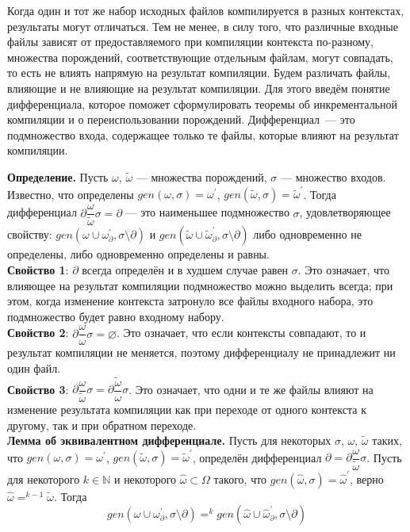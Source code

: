 
Когда один и тот же набор исходных файлов компилируется в разных контекстах, результаты могут отличаться. Тем не менее, в силу того, что различные входные файлы зависят от предоставляемого при компиляции контекста по-разному, множества порождений, соответствующие отдельным файлам, могут совпадать, то есть не влиять напрямую на результат компиляции. Будем различать файлы, влияющие и не влияющие на результат компиляции. Для этого введём понятие дифференциала, которое поможет сформулировать теоремы об инкрементальной компиляции и о переиспользовании порождений. Дифференциал~--- это подмножество входа, содержащее только те файлы, которые влияют на результат компиляции.

\textbf{Определение.} Пусть $\omega$, $\tilde{\omega}$ --- множества порождений, $\sigma$ --- множество входов. Известно, что определены $gen(\omega, \sigma) = \omega^\prime$, $gen(\tilde{\omega}, \sigma) = \tilde{\omega}^\prime$. Тогда дифференциал $\partial\dfrac{\omega}{\tilde{\omega}}\sigma = \partial$ --- это наименьшее подмножество $\sigma$, удовлетворяющее свойству: 
$gen(\omega \cup \omega^\prime_{\partial}, \sigma\setminus\partial)$ и
$gen(\tilde{\omega} \cup \tilde{\omega}^\prime_{\partial}, \sigma\setminus\partial)$ либо одновременно не определены, либо одновременно определены и равны.\\

\textbf{Свойство 1}: $\partial$ всегда определён и в худшем случае равен $\sigma$. Это означает, что влияющее на результат компиляции подмножество можно выделить всегда; при этом, когда изменение контекста затронуло все файлы входного набора, это подмножество будет равно входному набору.\\

\textbf{Свойство 2}: $\partial\dfrac{\omega}{\omega}\sigma = \varnothing$. Это означает, что если контексты совпадают, то и результат компиляции не меняется, поэтому дифференциалу не принадлежит ни один файл.\\

\textbf{Свойство 3}: $\partial\dfrac{\omega}{\tilde{\omega}}\sigma = \partial\dfrac{\tilde{\omega}}{\omega}\sigma$. Это означает, что одни и те же файлы влияют на изменение результата компиляции как при переходе от одного контекста к другому, так и при обратном переходе.\\

\textbf{Лемма об эквивалентном дифференциале.} Пусть для некоторых $\sigma$, $\omega$, $\tilde{\omega}$ таких, что $gen(\omega, \sigma) = \omega^\prime$, $gen(\tilde{\omega}, \sigma) = \tilde{\omega}^\prime$, определён дифференциал $\partial = \partial\dfrac{\omega}{\tilde{\omega}}\sigma$. Пусть для некоторого $k \in \mathbb{N}$ и некоторого $\hat{\omega} \subset \Omega$ такого, что $gen(\hat{\omega}, \sigma) = \hat{\omega}^\prime$, верно $\hat{\omega} =^{k-1} \tilde{\omega}$. Тогда $$gen(\omega \cup \omega^\prime_\partial, \sigma\setminus\partial) =^k gen(\hat{\omega} \cup \hat{\omega}^\prime_\partial, \sigma\setminus\partial)$$

